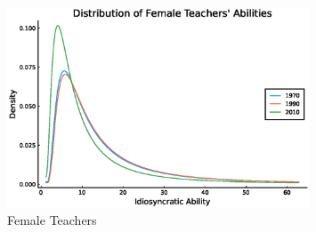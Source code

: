\documentclass[onehalfspacing,11pt]{article}
\begin{document}
	
	
	\begin{figure}
		\begin{center}
			\includegraphics[width=0.8\textwidth]{fT_women_steadystate.eps}
			\caption{Female Teachers}
			\label{fig:fem_ab}
		\end{center}
	\end{figure}
	
\end{document}
